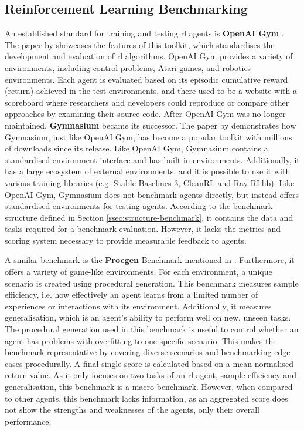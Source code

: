 \subsection{Reinforcement Learning Benchmarking}
An established standard for training and testing \ac{rl} agents is \textbf{OpenAI Gym} \cite{gymnasium}. The paper by \citet{gymnasium} showcases the features of this toolkit, which standardises the development and evaluation of \ac{rl} algorithms. OpenAI Gym provides a variety of environments, including control problems, Atari games, and robotics environments. Each agent is evaluated based on its episodic cumulative reward (return) achieved in the test environments, and there used to be a website with a scoreboard where researchers and developers could reproduce or compare other approaches by examining their source code. After OpenAI Gym was no longer maintained, \textbf{Gymnasium} became its successor. The paper by \citet{gymnasium} demonstrates how Gymnasium, just like OpenAI Gym, has become a popular toolkit with millions of downloads since its release. Like OpenAI Gym, Gymnasium contains a standardised environment interface and has built-in environments. Additionally, it has a large ecosystem of external environments, and it is possible to use it with various training libraries (e.g. Stable Baselines 3, CleanRL and Ray RLlib). Like OpenAI Gym, Gymnasium does not benchmark agents directly, but instead offers standardised environments for testing agents. According to the benchmark structure defined in Section \ref{ssec:structure-benchmark}, it contains the data and tasks required for a benchmark evaluation. However, it lacks the metrics and scoring system necessary to provide measurable feedback to agents.

A similar benchmark is the \textbf{Procgen} Benchmark mentioned in \citet{procgen}. Furthermore, it offers a variety of game-like environments. For each environment, a unique scenario is created using procedural generation. This benchmark measures sample efficiency, i.e. how effectively an agent learns from a limited number of experiences or interactions with its environment. Additionally, it measures generalisation, which is an agent's ability to perform well on new, unseen tasks. The procedural generation used in this benchmark is useful to control whether an agent has problems with overfitting to one specific scenario. This makes the benchmark representative by covering diverse scenarios and benchmarking edge cases procedurally. A final single score is calculated based on a mean normalised return value. As it only focuses on two tasks of an \ac{rl} agent, sample efficiency and generalisation, this benchmark is a macro-benchmark. However, when compared to other agents, this benchmark lacks information, as an aggregated score does not show the strengths and weaknesses of the agents, only their overall performance.



